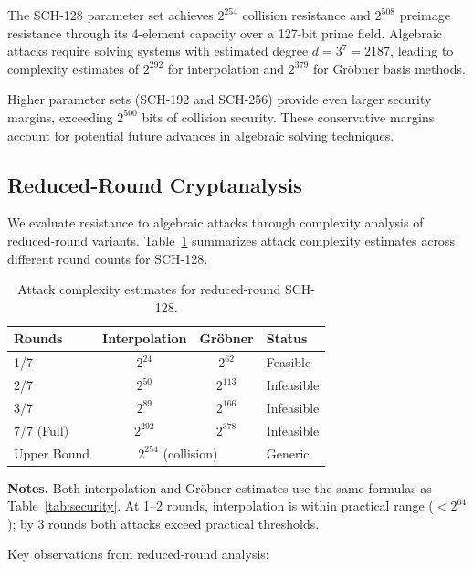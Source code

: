 ﻿\documentclass[english]{aucmcs}
\begin{document}
The SCH-128 parameter set achieves $2^{254}$ collision resistance and $2^{508}$ preimage resistance through its 4-element capacity over a 127-bit prime field. Algebraic attacks require solving systems with estimated degree $d = 3^7 = 2187$, leading to complexity estimates of $2^{292}$ for interpolation and $2^{379}$ for Gr\"obner basis methods.

Higher parameter sets (SCH-192 and SCH-256) provide even larger security margins, exceeding $2^{500}$ bits of collision security. These conservative margins account for potential future advances in algebraic solving techniques.


\subsection{Reduced-Round Cryptanalysis}
\label{sec:cryptanalysis}

We evaluate resistance to algebraic attacks through complexity analysis of reduced-round variants. Table~\ref{tab:attacks} summarizes attack complexity estimates across different round counts for SCH-128.

\begin{table}[H]
\centering
\caption{Attack complexity estimates for reduced-round SCH-128.}
\label{tab:attacks}
\begin{tabular}{@{}lccl@{}}
\toprule
Rounds & Interpolation & Gr\"obner & Status \\
\midrule
1/7 & $2^{24}$ & $2^{62}$ & Feasible \\
2/7 & $2^{50}$ & $2^{113}$ & Infeasible \\
3/7 & $2^{89}$ & $2^{166}$ & Infeasible \\
7/7 (Full) & $2^{292}$ & $2^{378}$ & Infeasible \\
\addlinespace
Upper Bound & \multicolumn{2}{c}{$2^{254}$ (collision)} & Generic \\
\bottomrule
\end{tabular}
\vspace{0.5em}
\begin{minipage}{0.95\linewidth}
\small
\textbf{Notes.} Both interpolation and Gr\"obner estimates use the same
formulas as Table~\ref{tab:security}. At 1--2 rounds, interpolation is
within practical range ($< 2^{64}$); by 3 rounds both attacks exceed practical thresholds.
\end{minipage}
\end{table}

Key observations from reduced-round analysis:
\end{document}
